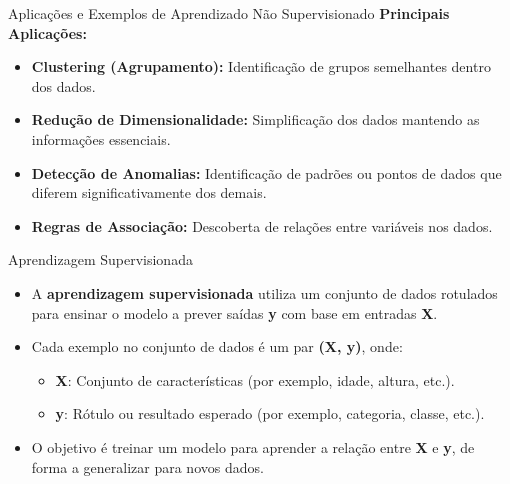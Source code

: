 \documentclass{beamer}
\begin{document}
\begin{frame}{Aplicações e Exemplos de Aprendizado Não Supervisionado}
    \textbf{Principais Aplicações:}
    \begin{itemize}
        \item \textbf{Clustering (Agrupamento):} Identificação de grupos semelhantes dentro dos dados.
        \item \textbf{Redução de Dimensionalidade:} Simplificação dos dados mantendo as informações essenciais.
        \item \textbf{Detecção de Anomalias:} Identificação de padrões ou pontos de dados que diferem significativamente dos demais.
        \item \textbf{Regras de Associação:} Descoberta de relações entre variáveis nos dados.
    \end{itemize}
\end{frame}


\begin{frame}[fragile]{Aprendizagem Supervisionada}
    \begin{itemize}
        \item A \textbf{aprendizagem supervisionada} utiliza um conjunto de dados rotulados para ensinar o modelo a prever saídas \textbf{y} com base em entradas \textbf{X}.
        \item Cada exemplo no conjunto de dados é um par \textbf{(X, y)}, onde:
        \begin{itemize}
            \item \textbf{X}: Conjunto de características (por exemplo, idade, altura, etc.).
            \item \textbf{y}: Rótulo ou resultado esperado (por exemplo, categoria, classe, etc.).
        \end{itemize}
        \item O objetivo é treinar um modelo para aprender a relação entre \textbf{X} e \textbf{y}, de forma a generalizar para novos dados.
    \end{itemize}
\end{frame}
\end{document}
